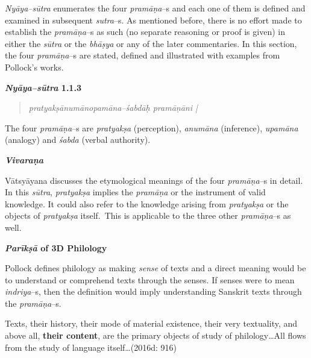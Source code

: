 \textit{Nyāya–sūtra} enumerates the four \textit{pramāṇa}–s and each one of them is defined and examined in subsequent \textit{sutra}–s. As mentioned before, there is no effort made to establish the \textit{pramāṇa}–s as such (no separate reasoning or proof is given) in either the \textit{sūtra} or the \textit{bhāṣya} or any of the later commentaries. In this section, the four \textit{pramāṇa}–s are stated, defined and illustrated with examples from Pollock’s works.

\textbf{\textit{Nyāya–sūtra} 1.1.3}

\vspace{-.3cm}

\begin{verse}
\textit{pratyakṣānumānopamāna–śabdāḥ pramāṇāni |}
\end{verse}

\vspace{-.3cm}

The four \textit{pramāṇa}–s are \textit{pratyakṣa} (perception), \textit{anumāna} (inference), \textit{upamāna} (analogy) and \textit{śabda }(verbal authority).


\textit{\textbf{Vivaraṇa}}

Vātsyāyana discusses the etymological meanings of the four \textit{pramā\-ṇa}–s in detail. In this \textit{sūtra}, \textit{pratyakṣa} implies the \textit{pramāṇa} or the instrument of valid knowledge. It could also refer to the knowledge arising from \textit{pratyakṣa} or the objects of \textit{pratyakṣa} itself.~This is applicable to the three other \textit{pramāṇa}–s as well.

\textbf{\textit{Parīkṣā} of 3D Philology}

Pollock defines philology as making \textit{sense} of texts and a direct meaning would be to understand or comprehend texts through the senses. If senses were to mean \textit{indriya}–s, then the definition would imply understanding Sanskrit texts through the\textit{ pramāṇa}–s.

\begin{myquote}
Texts, their history, their mode of material existence, their very textuality, and above all, \textbf{their content}, are the primary objects of study of philology…All flows from the study of language itself…(2016d: 916)
\end{myquote}

